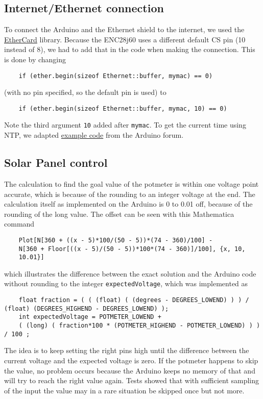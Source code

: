 \subsection{Internet/Ethernet connection}\label{subsec:internet/ethernetConnection}
    To connect the Arduino and the Ethernet shield to the internet, we used the \href{https://github.com/jcw/ethercard}{EtherCard} library.
    Because the ENC28j60 uses a different default CS pin (10 instead of 8), we had to add that in the code when making the connection.
    This is done by changing

    \begin{lstlisting}
    if (ether.begin(sizeof Ethernet::buffer, mymac) == 0)
    \end{lstlisting}

    (with no pin specified, so the default pin is used) to

    \begin{lstlisting}
    if (ether.begin(sizeof Ethernet::buffer, mymac, 10) == 0)
    \end{lstlisting}

    Note the third argument \lstinline|10| added after \lstinline|mymac|.
    To get the current time using NTP, we adapted \href{http://forum.arduino.cc/index.php?topic=171941.0}{example code} from the Arduino forum.

\subsection{Solar Panel control}\label{subsec:solarPanelControl}
    The calculation to find the goal value of the potmeter is within one voltage point accurate, which is because of the rounding to an integer voltage at the end.
    The calculation itself as implemented on the Arduino is 0 to 0.01 off, because of the rounding of the long value.
     The offset can be seen with this Mathematica command
    \begin{lstlisting}
    Plot[N[360 + ((x - 5)*100/(50 - 5))*(74 - 360)/100] -
    N[360 + Floor[((x - 5)/(50 - 5))*100*(74 - 360)]/100], {x, 10,
    10.01}]
    \end{lstlisting}
    which illustrates the difference between the exact solution and the Arduino code without rounding to the integer \verb|expectedVoltage|, which was implemented as
    \begin{lstlisting}
    float fraction = ( ( (float) ( (degrees - DEGREES_LOWEND) ) ) / (float) (DEGREES_HIGHEND - DEGREES_LOWEND) );
    int expectedVoltage = POTMETER_LOWEND +
    ( (long) ( fraction*100 * (POTMETER_HIGHEND - POTMETER_LOWEND) ) ) / 100 ;
    \end{lstlisting}
    The idea is to keep setting the right pins high until the difference between the current voltage and the expected voltage is zero.
    If the potmeter happens to skip the value, no problem occurs because the Arduino keeps no memory of that and will try to reach the right value again.
    Tests showed that with sufficient sampling of the input the value may in a rare situation be skipped once but not more.

